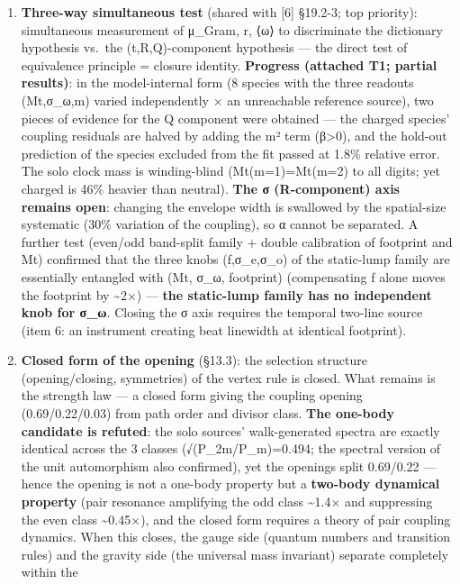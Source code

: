 \documentclass[
]{article}
\providecommand{\tightlist}{%
  \setlength{\itemsep}{0pt}\setlength{\parskip}{0pt}}
\begin{document}
\begin{enumerate}
\def\labelenumi{\arabic{enumi}.}
\tightlist
\item
  \textbf{Three-way simultaneous test} (shared with {[}6{]} §19.2-3; top
  priority): simultaneous measurement of μ\_Gram, r, ⟨ω⟩ to discriminate
  the dictionary hypothesis vs.~the (t,R,Q)-component hypothesis --- the
  direct test of equivalence principle = closure identity.
  \textbf{Progress (attached T1; partial results)}: in the
  model-internal form (8 species with the three readouts (Mt,σ\_ω,m)
  varied independently × an unreachable reference source), two pieces of
  evidence for the Q component were obtained --- the charged species'
  coupling residuals are halved by adding the m² term (β\textgreater0),
  and the hold-out prediction of the species excluded from the fit
  passed at 1.8\% relative error. The solo clock mass is winding-blind
  (Mt(m=1)=Mt(m=2) to all digits; yet charged is 46\% heavier than
  neutral). \textbf{The σ (R-component) axis remains open}: changing the
  envelope width is swallowed by the spatial-size systematic (30\%
  variation of the coupling), so α cannot be separated. A further test
  (even/odd band-split family + double calibration of footprint and Mt)
  confirmed that the three knobs (f,σ\_e,σ\_o) of the static-lump family
  are essentially entangled with (Mt, σ\_ω, footprint) (compensating f
  alone moves the footprint by \textasciitilde2×) --- \textbf{the
  static-lump family has no independent knob for σ\_ω}. Closing the σ
  axis requires the temporal two-line source (item 6: an instrument
  creating beat linewidth at identical footprint).
\item
  \textbf{Closed form of the opening} (§13.3): the selection structure
  (opening/closing, symmetries) of the vertex rule is closed. What
  remains is the strength law --- a closed form giving the coupling
  opening (0.69/0.22/0.03) from path order and divisor class.
  \textbf{The one-body candidate is refuted}: the solo sources'
  walk-generated spectra are exactly identical across the 3 classes
  (√(P\_2m/P\_m)=0.494; the spectral version of the unit automorphism
  also confirmed), yet the openings split 0.69/0.22 --- hence the
  opening is not a one-body property but a \textbf{two-body dynamical
  property} (pair resonance amplifying the odd class \textasciitilde1.4×
  and suppressing the even class \textasciitilde0.45×), and the closed
  form requires a theory of pair coupling dynamics. When this closes,
  the gauge side (quantum numbers and transition rules) and the gravity
  side (the universal mass invariant) separate completely within the

\end{enumerate}
\end{document}
